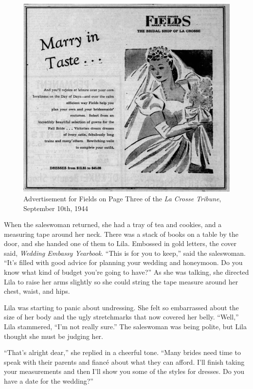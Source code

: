 \documentclass[
  letterpaper,
]{book}
\begin{document}
\begin{figure}[H]

{\centering \includegraphics[width=0.85\linewidth,height=\textheight,keepaspectratio]{images/Akou19.jpg}

}

\caption{Advertisement for Fields on Page Three of the \emph{La Crosse
Tribune}, September 10th, 1944}

\end{figure}%

When the saleswoman returned, she had a tray of tea and cookies, and a
measuring tape around her neck. There was a stack of books on a table by
the door, and she handed one of them to Lila. Embossed in gold letters,
the cover said, \emph{Wedding Embassy Yearbook}. ``This is for you to
keep,'' said the saleswoman. ``It's filled with good advice for planning
your wedding and honeymoon. Do you know what kind of budget you're going
to have?'' As she was talking, she directed Lila to raise her arms
slightly so she could string the tape measure around her chest, waist,
and hips.

Lila was starting to panic about undressing. She felt so embarrassed
about the size of her body and the ugly stretchmarks that now covered
her belly. ``Well,'' Lila stammered, ``I'm not really sure.'' The
saleswoman was being polite, but Lila thought she must be judging her.

``That's alright dear,'' she replied in a cheerful tone. ``Many brides
need time to speak with their parents and fiancé about what they can
afford. I'll finish taking your measurements and then I'll show you some
of the styles for dresses. Do you have a date for the wedding?''
\end{document}
